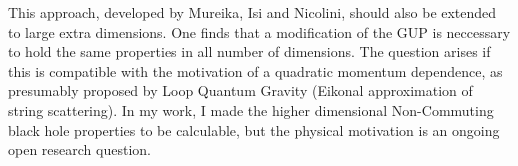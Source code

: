 \documentclass[10pt,a4paper, fleqn]{article}
\begin{document}
This approach, developed by Mureika, Isi and Nicolini, should also be extended to large extra dimensions. One finds that a modification of the GUP is neccessary to hold the same properties in all number of dimensions. The question arises if this is compatible with the motivation of a quadratic momentum dependence, as presumably proposed by Loop Quantum Gravity (Eikonal approximation of string scattering). In my work, I made the higher dimensional Non-Commuting black hole properties to be calculable, but the physical motivation is an ongoing open research question.
\end{document}
